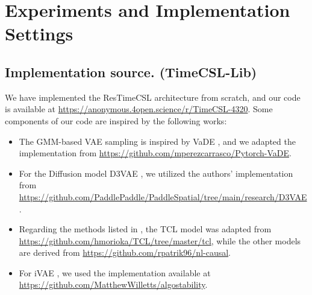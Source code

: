 \documentclass{article} %
\theoremstyle{plain}
\theoremstyle{definition}
\theoremstyle{remark}
\numberwithin{equation}{section}
\begin{document}




\newpage
\section{Experiments and Implementation Settings}\label{appendix:setup}

\subsection{Implementation source. (TimeCSL-Lib)}

We have implemented the ResTimeCSL architecture from scratch, and our code is available at \url{https://anonymous.4open.science/r/TimeCSL-4320}. Some components of our code are inspired by the following works:
\begin{itemize}
    \item The GMM-based VAE sampling is inspired by VaDE \citep{jiang2016variational}, and we adapted the implementation from \url{https://github.com/mperezcarrasco/Pytorch-VaDE}.
    \item For the Diffusion model D3VAE \citep{li_generative_2023}, we utilized the authors' implementation from \url{https://github.com/PaddlePaddle/PaddleSpatial/tree/main/research/D3VAE}.
    \item Regarding the methods listed in , the TCL model was adapted from \url{https://github.com/hmorioka/TCL/tree/master/tcl}, while the other models are derived from \url{https://github.com/rpatrik96/nl-causal}.
    \item For iVAE \citep{khemakhem2020variational}, we used the implementation available at \url{https://github.com/MatthewWilletts/algostability}.
\end{itemize}
\end{document}
